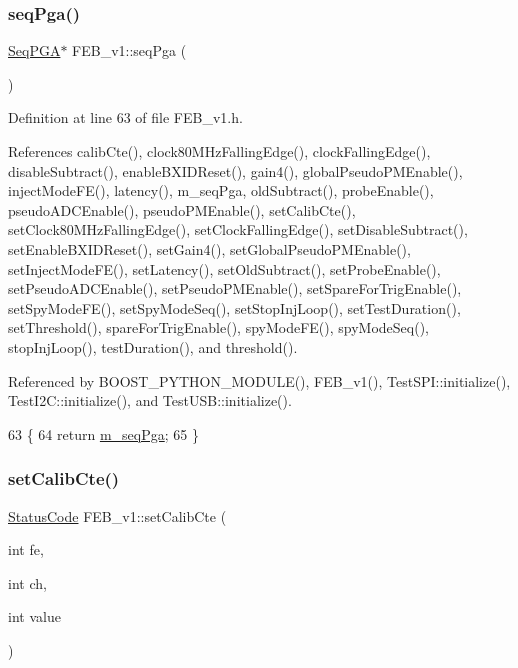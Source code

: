 \subsubsection{\texorpdfstring{seq\+Pga()}{seqPga()}}
{\footnotesize\ttfamily \hyperlink{classSeqPGA}{Seq\+P\+GA}$\ast$ F\+E\+B\+\_\+v1\+::seq\+Pga (\begin{DoxyParamCaption}{ }\end{DoxyParamCaption})\hspace{0.3cm}{\ttfamily [inline]}}



Definition at line 63 of file F\+E\+B\+\_\+v1.\+h.



References calib\+Cte(), clock80\+M\+Hz\+Falling\+Edge(), clock\+Falling\+Edge(), disable\+Subtract(), enable\+B\+X\+I\+D\+Reset(), gain4(), global\+Pseudo\+P\+M\+Enable(), inject\+Mode\+F\+E(), latency(), m\+\_\+seq\+Pga, old\+Subtract(), probe\+Enable(), pseudo\+A\+D\+C\+Enable(), pseudo\+P\+M\+Enable(), set\+Calib\+Cte(), set\+Clock80\+M\+Hz\+Falling\+Edge(), set\+Clock\+Falling\+Edge(), set\+Disable\+Subtract(), set\+Enable\+B\+X\+I\+D\+Reset(), set\+Gain4(), set\+Global\+Pseudo\+P\+M\+Enable(), set\+Inject\+Mode\+F\+E(), set\+Latency(), set\+Old\+Subtract(), set\+Probe\+Enable(), set\+Pseudo\+A\+D\+C\+Enable(), set\+Pseudo\+P\+M\+Enable(), set\+Spare\+For\+Trig\+Enable(), set\+Spy\+Mode\+F\+E(), set\+Spy\+Mode\+Seq(), set\+Stop\+Inj\+Loop(), set\+Test\+Duration(), set\+Threshold(), spare\+For\+Trig\+Enable(), spy\+Mode\+F\+E(), spy\+Mode\+Seq(), stop\+Inj\+Loop(), test\+Duration(), and threshold().



Referenced by B\+O\+O\+S\+T\+\_\+\+P\+Y\+T\+H\+O\+N\+\_\+\+M\+O\+D\+U\+L\+E(), F\+E\+B\+\_\+v1(), Test\+S\+P\+I\+::initialize(), Test\+I2\+C\+::initialize(), and Test\+U\+S\+B\+::initialize().


\begin{DoxyCode}
63                   \{
64     \textcolor{keywordflow}{return} \hyperlink{classFEB__v1_a6c7804ac86796f233a8393043adf2e77}{m\_seqPga};
65   \}
\end{DoxyCode}
\mbox{\label{classFEB__v1_acf3c8ad478ce506bb9d9cb3e4d3b6252}} 
\subsubsection{\texorpdfstring{set\+Calib\+Cte()}{setCalibCte()}}
{\footnotesize\ttfamily \hyperlink{classStatusCode}{Status\+Code} F\+E\+B\+\_\+v1\+::set\+Calib\+Cte (\begin{DoxyParamCaption}\item[{int}]{fe,  }\item[{int}]{ch,  }\item[{int}]{value }\end{DoxyParamCaption})}



